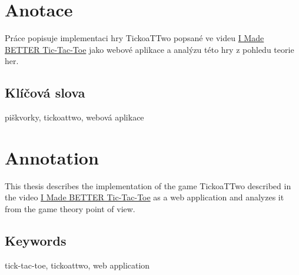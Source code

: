 \documentclass{socthesis}
\author{Marian Šámal}
\begin{document}
\maketitle






\pagestyle{empty}

\section*{Anotace}
Práce popisuje implementaci hry TickoaTTwo popsané ve videu
\href{https://www.youtube.com/watch?v=ePxrVU4M9uA}{I Made BETTER Tic-Tac-Toe}
jako webové aplikace a analýzu této hry z pohledu teorie her.

\subsection*{Klíčová slova}
piškvorky, tickoattwo, webová aplikace

\vspace{20mm}

\section*{Annotation}
This thesis describes the implementation of the game TickoaTTwo described in the video
\href{https://www.youtube.com/watch?v=ePxrVU4M9uA}{I Made BETTER Tic-Tac-Toe}
as a web application and analyzes it from the game theory point of view.

\subsection*{Keywords}
tick-tac-toe, tickoattwo, web application


\newpage
\pagestyle{plain}
\tableofcontents %

\setcounter{figure}{0}
\setcounter{table}{0}
\newpage
{}
\setcounter{page}{9}  %











\newpage
\printbibliography[title=Literatura]
\nocite{*}
\renewcommand{\baselinestretch}{1.5}



\listoffigures
{}
\end{document}
